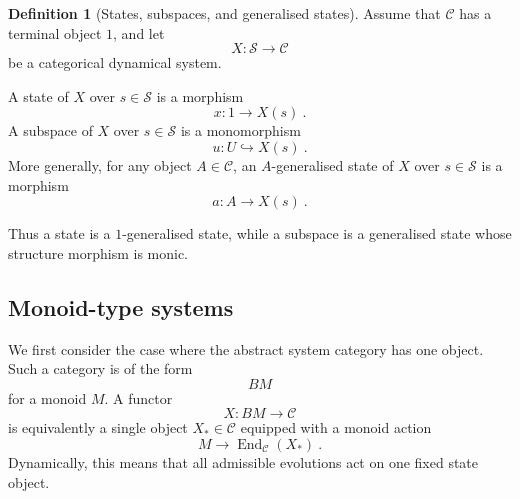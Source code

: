 \documentclass[a4paper,reqno,oneside]{amsart}
\theoremstyle{definition}
\newtheorem{definition}[theorem]{Definition}
\theoremstyle{remark}
\numberwithin{equation}{section}
\begin{document}
	
	\begin{definition}[States, subspaces, and generalised states]
		Assume that $\mathcal C$ has a terminal object $1$, and let
		\begin{equation}
			X\colon \mathcal S\to\mathcal C
		\end{equation}
		be a categorical dynamical system.
		
		A state of $X$ over $s\in\mathcal S$ is a morphism
		\begin{equation}
			x\colon 1\longrightarrow X(s) \ .
		\end{equation}
		A subspace of $X$ over $s\in\mathcal S$ is a monomorphism
		\begin{equation}
			u\colon U\hookrightarrow X(s) \ .
		\end{equation}
		More generally, for any object $A\in\mathcal C$, an $A$-generalised state
		of $X$ over $s\in\mathcal S$ is a morphism
		\begin{equation}
			a\colon A\longrightarrow X(s) \ .
		\end{equation}
	\end{definition}
	
	
	Thus a state is a $1$-generalised state, while a subspace is a
	generalised state whose structure morphism is monic.
	
	
	
	
	
	\subsection{Monoid-type systems}\label{sec: monoid type}
	
	We first consider the case where the abstract system category has one
	object. Such a category is of the form
	\begin{equation}
		BM
	\end{equation}
	for a monoid $M$. A functor
	\begin{equation}
		X\colon BM\to\mathcal C
	\end{equation}
	is equivalently a single object $X_*\in\mathcal C$ equipped with a monoid action
	\begin{equation}
		M\longrightarrow \operatorname{End}_{\mathcal C}(X_*) \ .
	\end{equation}
	Dynamically, this means that all admissible
	evolutions act on one fixed state object.
	
	
	
	
	
\end{document}
